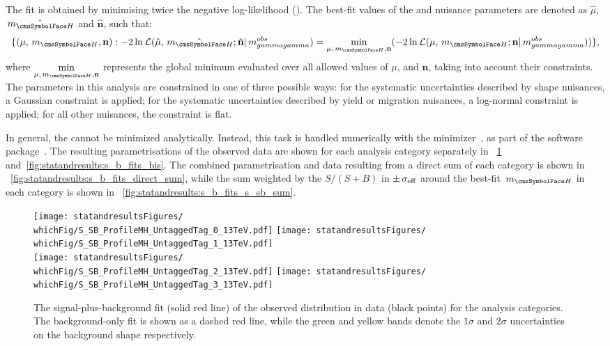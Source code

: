 The fit is obtained by minimising twice the negative log-likelihood (\NLL). 
The best-fit values of the \POI\s and nuisance parameters are denoted as $\hat{\mu}$, $\hat{\mH}$ and $\hat{\mathbf{n}}$, such that:
\begin{equation}
\{ (\mu, \mH, \mathbf{n}) : -2 \ln \mathcal{L}(\hat{\mu}, \hat{\mH};\hat{\mathbf{n}}| \mgg^{obs}) = \min _{\mu,\mH , \mathbf{n}}(-2 \ln \mathcal{L}(\mu, \mH; \mathbf{n}| \mgg^{obs})) \},
\end{equation}
where $\displaystyle\min_{ \mu, \mH ,\mathbf{n}}$ represents the global minimum evaluated over all allowed values of $\mu$, \mH and $\mathbf{n}$, taking into account their constraints. The parameters in this analysis are constrained in one of three possible ways: for the systematic uncertainties described by shape nuisances, a Gaussian constraint is applied; for the systematic uncertainties described by yield or migration nuisances, a log-normal constraint is applied; for all other nuisances, the constraint is flat. 

 In general, the \NLL cannot be minimized analytically. Instead, this task is handled numerically with the \Minuit minimizer~\cite{minuit}, as part of the \RooFit software package~\cite{RooFit}. 
The resulting parametrisations of the observed data are shown for each analysis category separately in \Fig\s~\ref{fig:statandresults:s_b_fits} and~\ref{fig:statandresults:s_b_fits_bis}. The combined parametrisation and data resulting from a direct sum of each category is shown in \Fig~\ref{fig:statandresults:s_b_fits_direct_sum}, while the sum weighted by the $S/(S+B)$ in $\pm \,\sigma_{\text{eff}}$ around the best-fit $\mH$ in each category is shown in \Fig~\ref{fig:statandresults:s_b_fits_s_sb_sum}. 

\begin{figure}[p]
\centering
\texttt{[image: statandresultsFigures/\\whichFig/S\_SB\_ProfileMH\_UntaggedTag\_0\_13TeV.pdf]} 
\texttt{[image: statandresultsFigures/\\whichFig/S\_SB\_ProfileMH\_UntaggedTag\_1\_13TeV.pdf]}\\ 
\texttt{[image: statandresultsFigures/\\whichFig/S\_SB\_ProfileMH\_UntaggedTag\_2\_13TeV.pdf]} 
\texttt{[image: statandresultsFigures/\\whichFig/S\_SB\_ProfileMH\_UntaggedTag\_3\_13TeV.pdf]} \\
\caption{The signal-plus-background fit (solid red line) of the observed \mgg distribution in data (black points) for the \Untagged analysis categories. The background-only fit is shown as a dashed red line, while the green and yellow bands denote the $1\sigma$ and $2\sigma$ uncertainties on the background shape respectively.}

\label{fig:statandresults:s_b_fits}
\end{figure}

